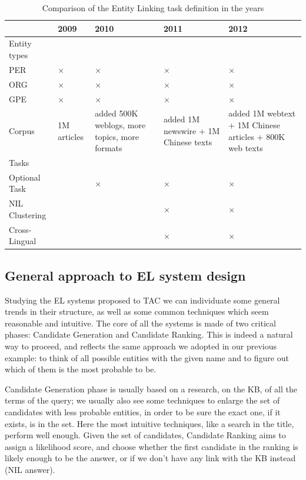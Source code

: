 \documentclass[a4paper,11pt]{report}
\newcommand{\tick}{$\times$}
\begin{document}
\begin{table}
\begin{tabularx}{\linewidth}{lXXXX}
 & 2009 & 2010 & 2011 & 2012 \\
\hline Entity types \\ 
  PER & \tick & \tick & \tick & \tick \\
  ORG & \tick & \tick & \tick & \tick \\
  GPE & \tick & \tick & \tick & \tick \\
\hline Corpus & 1M articles & added 500K weblogs, more topics, more formats & added 1M newswire + 1M Chinese texts & added 1M webtext + 1M Chinese articles + 800K web texts\\
\hline Tasks\\ 
Optional Task & & \tick & \tick & \tick \\
NIL Clustering & & & \tick & \tick \\
Cross-Lingual  & & & \tick & \tick \\
 
 

\end{tabularx}

\caption{Comparison of the Entity Linking task definition in the years}
\label{tab:el}
\end{table}

\subsection{General approach to EL system design}
Studying the EL systems proposed to TAC we can individuate some general trends in their structure, as well as some common techniques which seem reasonable and intuitive.
The core of all the systems is made of two critical phases: Candidate Generation and Candidate Ranking. This is indeed a natural way to proceed, and reflects the same approach we adopted in our previous example: to think of all possible entities with the given name and to figure out which of them is the most probable to be.

Candidate Generation phase is usually based on a research, on the KB, of all the terms of the query; we usually also see some techniques to enlarge the set of candidates with less probable entities, in order to be sure the exact one, if it exists, is in the set. Here the most intuitive techniques, like a search in the title, perform well enough.
Given the set of candidates, Candidate Ranking aims to assign a likelihood score, and choose whether the first candidate in the ranking is likely enough to be the answer, or if we don't have any link with the KB instead (NIL answer).
\end{document}
